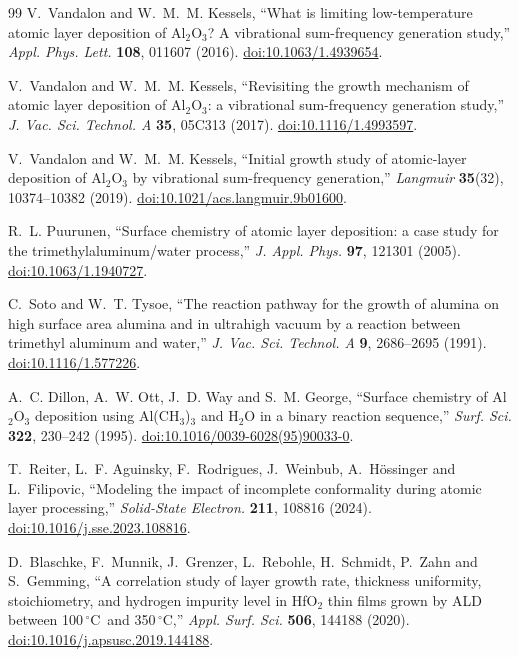 \documentclass[11pt,letterpaper]{article}
\newcommand{\degC}{$^{\circ}$C}
\begin{document}
\begin{thebibliography}{99}
V.~Vandalon and W.~M.~M. Kessels,
``What is limiting low-temperature atomic layer deposition of Al$_2$O$_3$? A vibrational sum-frequency generation study,''
\emph{Appl. Phys. Lett.} \textbf{108}, 011607 (2016).
\href{https://doi.org/10.1063/1.4939654}{doi:10.1063/1.4939654}.

V.~Vandalon and W.~M.~M. Kessels,
``Revisiting the growth mechanism of atomic layer deposition of Al$_2$O$_3$: a vibrational sum-frequency generation study,''
\emph{J. Vac. Sci. Technol. A} \textbf{35}, 05C313 (2017).
\href{https://doi.org/10.1116/1.4993597}{doi:10.1116/1.4993597}.

V.~Vandalon and W.~M.~M. Kessels,
``Initial growth study of atomic-layer deposition of Al$_2$O$_3$ by vibrational sum-frequency generation,''
\emph{Langmuir} \textbf{35}(32), 10374--10382 (2019).
\href{https://doi.org/10.1021/acs.langmuir.9b01600}{doi:10.1021/acs.langmuir.9b01600}.

R.~L. Puurunen,
``Surface chemistry of atomic layer deposition: a case study for the trimethylaluminum/water process,''
\emph{J. Appl. Phys.} \textbf{97}, 121301 (2005).
\href{https://doi.org/10.1063/1.1940727}{doi:10.1063/1.1940727}.

C.~Soto and W.~T. Tysoe,
``The reaction pathway for the growth of alumina on high surface area alumina and in ultrahigh vacuum by a reaction between trimethyl aluminum and water,''
\emph{J. Vac. Sci. Technol. A} \textbf{9}, 2686--2695 (1991).
\href{https://doi.org/10.1116/1.577226}{doi:10.1116/1.577226}.

A.~C. Dillon, A.~W. Ott, J.~D. Way and S.~M. George,
``Surface chemistry of Al$_2$O$_3$ deposition using Al(CH$_3$)$_3$ and H$_2$O in a binary reaction sequence,''
\emph{Surf. Sci.} \textbf{322}, 230--242 (1995).
\href{https://doi.org/10.1016/0039-6028(95)90033-0}{doi:10.1016/0039-6028(95)90033-0}.

T.~Reiter, L.~F. Aguinsky, F.~Rodrigues, J.~Weinbub, A.~H\"ossinger and L.~Filipovic,
``Modeling the impact of incomplete conformality during atomic layer processing,''
\emph{Solid-State Electron.} \textbf{211}, 108816 (2024).
\href{https://doi.org/10.1016/j.sse.2023.108816}{doi:10.1016/j.sse.2023.108816}.

D.~Blaschke, F.~Munnik, J.~Grenzer, L.~Rebohle, H.~Schmidt, P.~Zahn and S.~Gemming,
``A correlation study of layer growth rate, thickness uniformity, stoichiometry, and hydrogen impurity level in HfO$_2$ thin films grown by ALD between 100\,\degC\ and 350\,\degC,''
\emph{Appl. Surf. Sci.} \textbf{506}, 144188 (2020).
\href{https://doi.org/10.1016/j.apsusc.2019.144188}{doi:10.1016/j.apsusc.2019.144188}.


\end{thebibliography}
\end{document}
